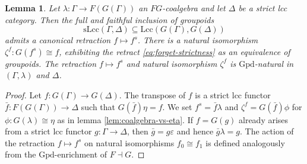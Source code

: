 \documentclass[a4paper]{article}
\newtheorem{lemma}[theorem]{Lemma}
\theoremstyle{remark}
\theoremstyle{definition}
\begin{document}
\begin{lemma}
  \label{lem:strictification}
  Let $\lambda : \Gamma \rightarrow F(G(\Gamma))$ an $FG$-coalgebra and let $\Delta$ be a strict lcc category.
  Then the full and faithful inclusion of groupoids
  \begin{equation}
    \label{eq:forget-strictness}
    \mathrm{sLcc}(\Gamma, \Delta) \subseteq \mathrm{Lcc}(G(\Gamma), G(\Delta))
  \end{equation}
  admits a canonical retraction $f \mapsto f^s$.
  There is a natural isomorphism $\zeta^f : G(f^s) \cong f$, exhibiting the retract \eqref{eq:forget-strictness} as an equivalence of groupoids.
  The retraction $f \mapsto f^s$ and natural isomorphism $\zeta^f$ is $\mathrm{Gpd}$-natural in $(\Gamma, \lambda)$ and $\Delta$.
\end{lemma}
\begin{proof}
  Let $f : G(\Gamma) \rightarrow G(\Delta)$.
  The transpose of $f$ is a strict lcc functor $\bar f : F(G(\Gamma)) \rightarrow \Delta$ such that $G(\bar f) \eta = f$.
  We set $f^s = \bar f \lambda$ and $\zeta^f = G(\bar f) \phi$ for $\phi : G(\lambda) \cong \eta$ as in lemma \ref{lem:coalgebra-vs-eta}.
  If $f = G(g)$ already arises from a strict lcc functor $g : \Gamma \rightarrow \Delta$, then $\bar g = g \varepsilon$ and hence $\bar g \lambda = g$.
  The action of the retraction $f \mapsto f^s$ on natural isomorphisms $f_0 \cong f_1$ is defined analogously from the $\mathrm{Gpd}$-enrichment of $F \dashv G$.
\end{proof}
\end{document}
